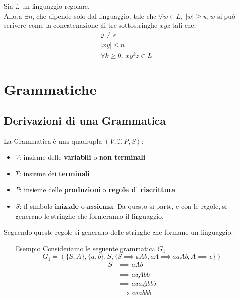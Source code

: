\documentclass[12pt]{article}
\begin{document}
Sia $L$ un linguaggio regolare.\\
Allora $\exists n$, che dipende solo dal linguaggio, tale che $\forall w \in L,\ |w| \ge n, w$ si può scrivere come la concatenazione di tre  sottostringhe $xyz$ tali che:
\begin{gather*}
    y\neq \epsilon\\
    |xy| \leq n \\
    \forall k \geq 0,\ xy^kz \in L
\end{gather*}

\section{Grammatiche}
\subsection{Derivazioni di una Grammatica}
La Grammatica è una quadrupla $(V,T,P,S)$:
\begin{itemize}
    \item $V$: insieme delle \textbf{variabili} o \textbf{non terminali}
    \item $T$: insieme dei \textbf{terminali}
    \item $P$: insieme delle \textbf{produzioni} o \textbf{regole di riscrittura}
    \item $S$: il simbolo \textbf{iniziale} o \textbf{assioma}. Da questo si parte, e con le regole, si generano le stringhe che formeranno il linguaggio.
\end{itemize}
Seguendo queste regole si generano delle stringhe che formano un linguaggio.
\begin{itemize}
    \item[Esempio] Consideriamo le seguente grammatica $G_1$
    \begin{equation*}
        G_1=(\{S,A\},\{a,b\},S,\{S \implies aAb,aA \implies aaAb,A\implies \epsilon\})
    \end{equation*}
    \begin{align*}
        S &\implies \underline{aA}b\\
        &\implies a\underline{aA}bb\\
        &\implies aaa\underline{A}bbb\\
        &\implies aaabbb
    \end{align*}
\end{itemize}
\end{document}
